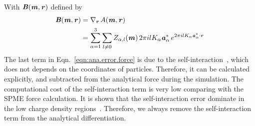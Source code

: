 \documentclass[aps,pre,preprint,unsortedaddress]{revtex4}
\renewcommand{\v}[1]{\textbf{\textit{#1}}}
\begin{document}
With $\v B(\v m, \v r)$ defined by
\begin{align}\nonumber
  \v B(\v m, \v r)
  &=
  \nabla_{\v r}\,A(\v m, \v r)\\\label{eqn:error-B}
  &=
  \sum_{\alpha=1}^3\sum_{l\neq 0}
  Z_{\alpha,l}(\v m)\,
  2\pi i l K_\alpha\v a_\alpha^\ast\,e^{2\pi i l K_\alpha\v a^\ast_\alpha\cdot \v r} 
\end{align}
The last term in Eqn.~\eqref{eqn:ana.error.force} is due to the
self-interaction~\cite{cerutti2009staggered, ballenegger2011removal,
  neelov2010interlaced}, which does not depends on the coordinates of
particles. Therefore, it can be calculated explicitly, and subtracted
from the analytical force during the simulation. The computational cost of
the self-interaction term is very low comparing with the SPME
force calculation. It is shown that the self-interaction  error
dominate in the low charge density regions~\cite{cerutti2009staggered}.
Therefore, we always remove the self-interaction term from
the analytical differentiation.
\end{document}
